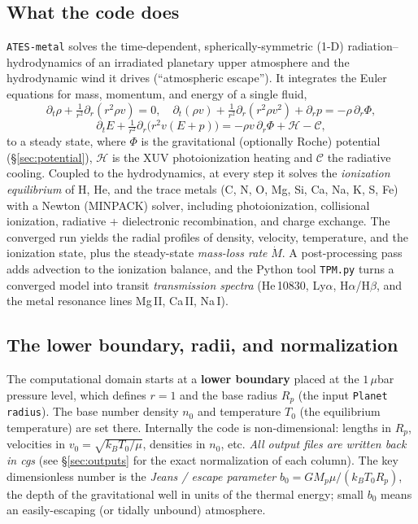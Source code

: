 \documentclass[english,a4paper]{kiseon_memo}
\begin{document}
\subsection{What the code does}
\texttt{ATES-metal} solves the time-dependent, spherically-symmetric (1-D)
radiation--hydrodynamics of an irradiated planetary upper atmosphere and the
hydrodynamic wind it drives (``atmospheric escape''). It integrates the Euler
equations for mass, momentum, and energy of a single fluid,
\[
\partial_t \rho + \tfrac{1}{r^2}\partial_r(r^2\rho v)=0,\quad
\partial_t(\rho v)+\tfrac{1}{r^2}\partial_r(r^2\rho v^2)+\partial_r p
   = -\rho\,\partial_r\Phi,
\]
\[
\partial_t E + \tfrac{1}{r^2}\partial_r\!\big(r^2 v(E+p)\big)
   = -\rho v\,\partial_r\Phi + \mathcal{H} - \mathcal{C},
\]
to a steady state, where $\Phi$ is the gravitational (optionally Roche) potential
(\S\ref{sec:potential}), $\mathcal{H}$ is the XUV photoionization heating and
$\mathcal{C}$ the radiative cooling. Coupled to the hydrodynamics, at every step it solves the
\emph{ionization equilibrium} of H, He, and the trace metals (C, N, O, Mg, Si,
Ca, Na, K, S, Fe) with a Newton (MINPACK) solver, including photoionization,
collisional ionization, radiative + dielectronic recombination, and charge
exchange. The converged run yields the radial profiles of density, velocity,
temperature, and the ionization state, plus the steady-state \emph{mass-loss
rate} $\dot M$. A post-processing pass adds advection to the ionization balance,
and the Python tool \texttt{TPM.py} turns a converged model into transit
\emph{transmission spectra} (He\,10830, Ly$\alpha$, H$\alpha$/H$\beta$, and the
metal resonance lines Mg\,II, Ca\,II, Na\,I).

\subsection{The lower boundary, radii, and normalization}
The computational domain starts at a \textbf{lower boundary} placed at the
$1\,\mu$bar pressure level, which defines $r=1$ and the base radius $R_p$ (the
input \texttt{Planet radius}). The base number density $n_0$ and temperature
$T_0$ (the equilibrium temperature) are set there. Internally the code is
non-dimensional: lengths in $R_p$, velocities in $v_0=\sqrt{k_BT_0/\mu}$,
densities in $n_0$, etc. \emph{All output files are written back in cgs} (see
\S\ref{sec:outputs} for the exact normalization of each column). The key
dimensionless number is the \emph{Jeans / escape parameter}
$b_0 = GM_p\mu/(k_BT_0R_p)$, the depth of the gravitational well in units of the
thermal energy; small $b_0$ means an easily-escaping (or tidally unbound)
atmosphere.
\end{document}
